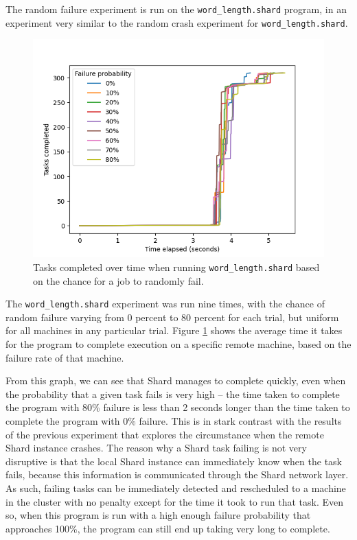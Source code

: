 \documentclass[twoside]{report}
\begin{document}
\begin{sloppypar}
  The random failure experiment is run on the \texttt{word\_length.shard} program, in an experiment very similar to the random crash experiment for \texttt{word\_length.shard}.
\end{sloppypar}

\begin{figure}[h]
  \begin{center}
    \includegraphics[scale=0.9]{img/experiments/e8_1620960581241.png}
    \caption{Tasks completed over time when running \texttt{word\_length.shard} based on the chance for a job to randomly fail.}
    \label{fig:failwordlength}
  \end{center}
\end{figure}

The \texttt{word\_length.shard} experiment was run nine times, with the chance of random failure varying from 0 percent to 80 percent for each trial, but uniform for all machines in any particular trial.
Figure \ref{fig:failwordlength} shows the average time it takes for the program to complete execution on a specific remote machine, based on the failure rate of that machine.

From this graph, we can see that Shard manages to complete quickly, even when the probability that a given task fails is very high -- the time taken to complete the program with 80\% failure is less than 2 seconds longer than the time taken to complete the program with 0\% failure.
This is in stark contrast with the results of the previous experiment that explores the circumstance when the remote Shard instance crashes.
The reason why a Shard task failing is not very disruptive is that the local Shard instance can immediately know when the task fails, because this information is communicated through the Shard network layer.
As such, failing tasks can be immediately detected and rescheduled to a machine in the cluster with no penalty except for the time it took to run that task.
Even so, when this program is run with a high enough failure probability that approaches 100\%, the program can still end up taking very long to complete.
\end{document}

